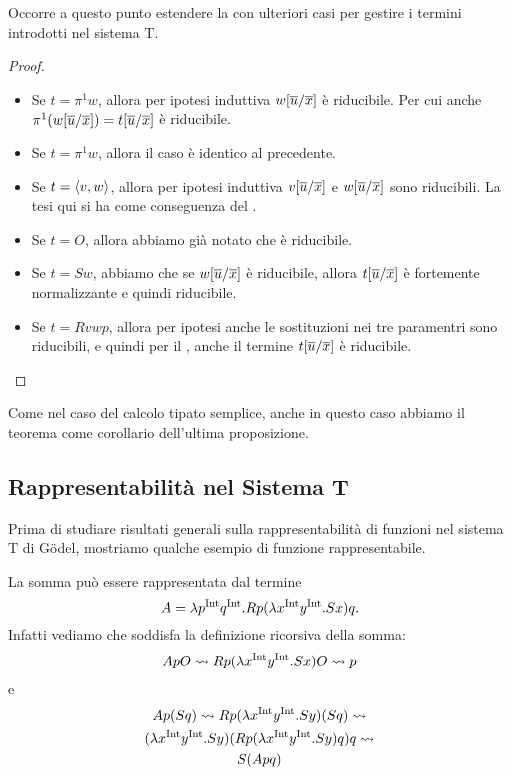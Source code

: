 \documentclass[]{marticle}
\begin{document}
Occorre a questo punto estendere la  con ulteriori casi per
gestire i termini introdotti nel sistema T.

\begin{proof}
    \begin{itemize}
        \item Se $t = \pi^1 w$, allora per ipotesi induttiva
            $w[\overline{u}/\overline{x}]$ \`e riducibile. Per cui anche 
            $\pi^1 (w[\overline{u}/\overline{x}]) = t [\overline{u}/\overline{x}]$ \`e riducibile.
        \item Se $t = \pi^1 w$, allora il caso \`e identico al precedente.
        \item Se $t = \langle v,w \rangle$, allora per ipotesi induttiva
            $v[\overline{u}/\overline{x}]$ e $w[\overline{u}/\overline{x}]$ sono riducibili. La tesi qui si ha come conseguenza
            del .
        \item Se $t=O$, allora abbiamo gi\`a notato che \`e riducibile.
        \item Se $t = Sw$, abbiamo che se $w[\overline{u}/\overline{x}]$
            \`e riducibile, allora $t[\overline{u}/\overline{x}]$ \`e
            fortemente normalizzante e quindi riducibile.
        \item Se $t = Rvwp$, allora per ipotesi anche le sostituzioni nei tre
            paramentri sono riducibili, e quindi per il , anche il
            termine $t[\overline{u}/\overline{x}]$ \`e riducibile.
    \end{itemize}
\end{proof}

Come nel caso del calcolo tipato semplice, anche in questo caso abbiamo il
teorema come corollario dell'ultima proposizione.

\subsection{Rappresentabilit\`a nel Sistema T}

Prima di studiare risultati generali sulla rappresentabilit\`a di funzioni nel
sistema T di G\"odel, mostriamo qualche esempio di funzione rappresentabile.

La somma pu\`o essere rappresentata dal termine
\[
    A = \lambda p^{\text{Int}} q^{\text{Int}}. Rp (\lambda x^{\text{Int}} y^{\text{Int}}. Sx) q.
\]
Infatti vediamo che soddisfa la definizione ricorsiva della somma:
\begin{gather*}
    ApO \rightsquigarrow R p (\lambda x^{\text{Int}} y^{\text{Int}}. Sx) O \rightsquigarrow p
\end{gather*}
e 
\begin{gather*}
    Ap(Sq) \rightsquigarrow R p (\lambda x^{\text{Int}} y^{\text{Int}}. Sy) (Sq) \rightsquigarrow \\ (\lambda x^{\text{Int}} y^{\text{Int}}.
    Sy)(R p (\lambda x^{\text{Int}} y^{\text{Int}}. Sy) q) q \rightsquigarrow \\
    S (A pq)
\end{gather*}
\end{document}
